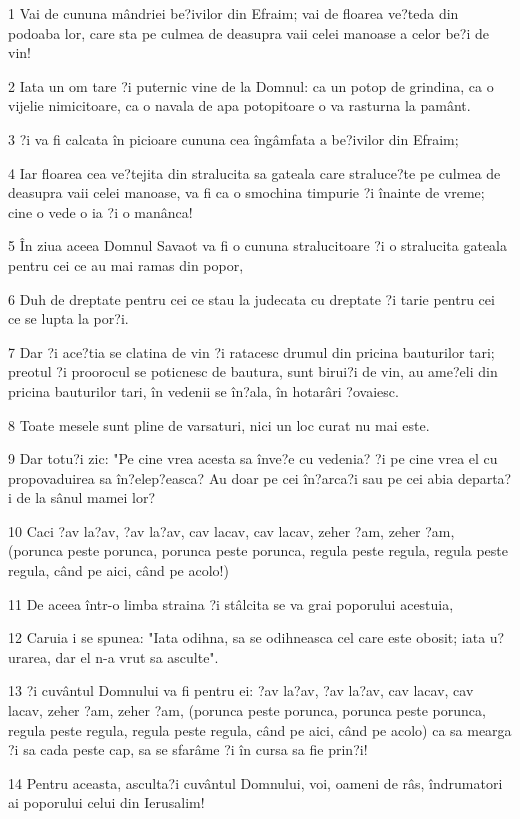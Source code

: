 \par 1 Vai de cununa mândriei be?ivilor din Efraim; vai de floarea ve?teda din podoaba lor, care sta pe culmea de deasupra vaii celei manoase a celor be?i de vin!
\par 2 Iata un om tare ?i puternic vine de la Domnul: ca un potop de grindina, ca o vijelie nimicitoare, ca o navala de apa potopitoare o va rasturna la pamânt.
\par 3 ?i va fi calcata în picioare cununa cea îngâmfata a be?ivilor din Efraim;
\par 4 Iar floarea cea ve?tejita din stralucita sa gateala care straluce?te pe culmea de deasupra vaii celei manoase, va fi ca o smochina timpurie ?i înainte de vreme; cine o vede o ia ?i o manânca!
\par 5 În ziua aceea Domnul Savaot va fi o cununa stralucitoare ?i o stralucita gateala pentru cei ce au mai ramas din popor,
\par 6 Duh de dreptate pentru cei ce stau la judecata cu dreptate ?i tarie pentru cei ce se lupta la por?i.
\par 7 Dar ?i ace?tia se clatina de vin ?i ratacesc drumul din pricina bauturilor tari; preotul ?i proorocul se poticnesc de bautura, sunt birui?i de vin, au ame?eli din pricina bauturilor tari, în vedenii se în?ala, în hotarâri ?ovaiesc.
\par 8 Toate mesele sunt pline de varsaturi, nici un loc curat nu mai este.
\par 9 Dar totu?i zic: "Pe cine vrea acesta sa înve?e cu vedenia? ?i pe cine vrea el cu propovaduirea sa în?elep?easca? Au doar pe cei în?arca?i sau pe cei abia departa?i de la sânul mamei lor?
\par 10 Caci ?av la?av, ?av la?av, cav lacav, cav lacav, zeher ?am, zeher ?am, (porunca peste porunca, porunca peste porunca, regula peste regula, regula peste regula, când pe aici, când pe acolo!)
\par 11 De aceea într-o limba straina ?i stâlcita se va grai poporului acestuia,
\par 12 Caruia i se spunea: "Iata odihna, sa se odihneasca cel care este obosit; iata u?urarea, dar el n-a vrut sa asculte".
\par 13 ?i cuvântul Domnului va fi pentru ei: ?av la?av, ?av la?av, cav lacav, cav lacav, zeher ?am, zeher ?am, (porunca peste porunca, porunca peste porunca, regula peste regula, regula peste regula, când pe aici, când pe acolo) ca sa mearga ?i sa cada peste cap, sa se sfarâme ?i în cursa sa fie prin?i!
\par 14 Pentru aceasta, asculta?i cuvântul Domnului, voi, oameni de râs, îndrumatori ai poporului celui din Ierusalim!
